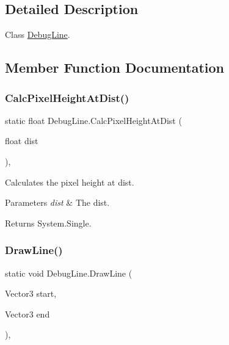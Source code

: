 \subsection{Detailed Description}
Class \hyperlink{class_debug_line}{Debug\+Line}. 



\subsection{Member Function Documentation}
\mbox{\label{class_debug_line_a51fdc719debca09b01cbdbd6ee34fb5d}} 
\subsubsection{\texorpdfstring{Calc\+Pixel\+Height\+At\+Dist()}{CalcPixelHeightAtDist()}}
{\footnotesize\ttfamily static float Debug\+Line.\+Calc\+Pixel\+Height\+At\+Dist (\begin{DoxyParamCaption}\item[{float}]{dist }\end{DoxyParamCaption})\hspace{0.3cm}{\ttfamily [inline]}, {\ttfamily [static]}}



Calculates the pixel height at dist. 


\begin{DoxyParams}{Parameters}
{\em dist} & The dist.\\
\hline
\end{DoxyParams}
\begin{DoxyReturn}{Returns}
System.\+Single.
\end{DoxyReturn}
\mbox{\label{class_debug_line_ae6b924e0cf572d87f77b34b66ff33515}} 
\subsubsection{\texorpdfstring{Draw\+Line()}{DrawLine()}\hspace{0.1cm}{\footnotesize\ttfamily [1/2]}}
{\footnotesize\ttfamily static void Debug\+Line.\+Draw\+Line (\begin{DoxyParamCaption}\item[{Vector3}]{start,  }\item[{Vector3}]{end }\end{DoxyParamCaption})\hspace{0.3cm}{\ttfamily [inline]}, {\ttfamily [static]}}



